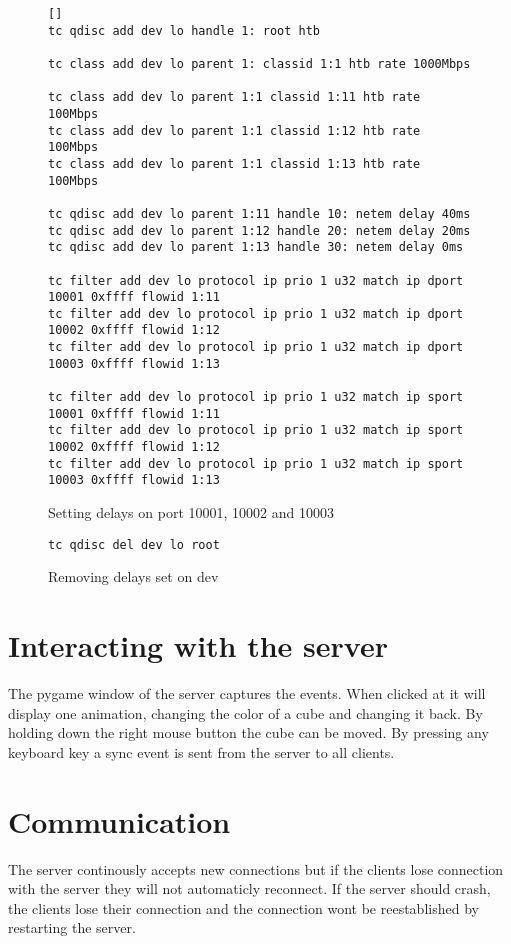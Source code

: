 \begin{figure}[h! ]
\begin{verbatim}[]
tc qdisc add dev lo handle 1: root htb

tc class add dev lo parent 1: classid 1:1 htb rate 1000Mbps

tc class add dev lo parent 1:1 classid 1:11 htb rate 100Mbps
tc class add dev lo parent 1:1 classid 1:12 htb rate 100Mbps
tc class add dev lo parent 1:1 classid 1:13 htb rate 100Mbps

tc qdisc add dev lo parent 1:11 handle 10: netem delay 40ms
tc qdisc add dev lo parent 1:12 handle 20: netem delay 20ms
tc qdisc add dev lo parent 1:13 handle 30: netem delay 0ms

tc filter add dev lo protocol ip prio 1 u32 match ip dport 10001 0xffff flowid 1:11
tc filter add dev lo protocol ip prio 1 u32 match ip dport 10002 0xffff flowid 1:12
tc filter add dev lo protocol ip prio 1 u32 match ip dport 10003 0xffff flowid 1:13

tc filter add dev lo protocol ip prio 1 u32 match ip sport 10001 0xffff flowid 1:11
tc filter add dev lo protocol ip prio 1 u32 match ip sport 10002 0xffff flowid 1:12
tc filter add dev lo protocol ip prio 1 u32 match ip sport 10003 0xffff flowid 1:13
\end{verbatim}
\caption{Setting delays on port 10001, 10002 and 10003}
\end{figure}

\begin{figure}[h!]
\begin{verbatim}
tc qdisc del dev lo root
\end{verbatim}
\caption{Removing delays set on dev}
\end{figure}

\section{Interacting with the server}
The pygame window of the server captures the events. When clicked at it will display one animation, changing the color of a cube and changing it back. By holding down the right mouse button the cube can be moved. By pressing any keyboard key a sync event is sent from the server to all clients. 

\section{Communication}
The server continously accepts new connections but if the clients lose connection with the server they will not automaticly reconnect. If the server should crash, the clients lose their connection and the connection wont be reestablished by restarting the server.

